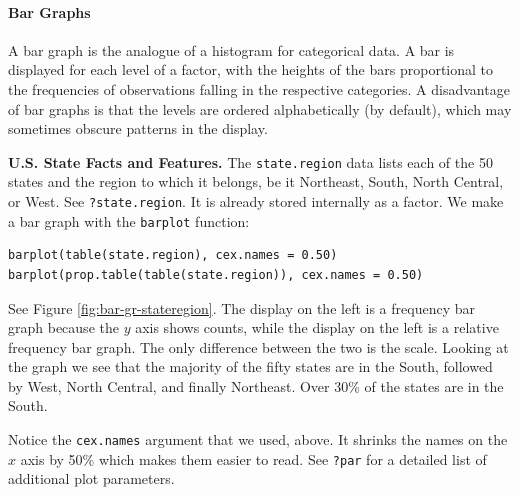 \documentclass[captions=tableheading]{scrbook}
\begin{document}
\paragraph*{Bar Graphs}
\label{par:Bar-Graphs}

A bar graph is the analogue of a histogram for categorical data. A bar is displayed for each level of a factor, with the heights of the bars proportional to the frequencies of observations falling in the respective categories. A disadvantage of bar graphs is that the levels are ordered alphabetically (by default), which may sometimes obscure patterns in the display. 

\begin{example}
\textbf{U.S. State Facts and Features.} The \texttt{state.region} data lists each of the 50 states and the region to which it belongs, be it Northeast, South, North Central, or West. See \texttt{?state.region}. It is already stored internally as a factor. We make a bar graph with the \texttt{barplot} function: 



\begin{verbatim}
barplot(table(state.region), cex.names = 0.50)
barplot(prop.table(table(state.region)), cex.names = 0.50)
\end{verbatim}

See Figure \ref{fig:bar-gr-stateregion}. The display on the left is a frequency bar graph because the \(y\) axis shows counts, while the display on the left is a relative frequency bar graph. The only difference between the two is the scale. Looking at the graph we see that the majority of the fifty states are in the South, followed by West, North Central, and finally Northeast. Over 30\% of the states are in the South.

Notice the \texttt{cex.names} argument that we used, above. It shrinks the names on the \(x\) axis by 50\% which makes them easier to read. See \texttt{?par} for a detailed list of additional plot parameters.







\end{example}
\end{document}
